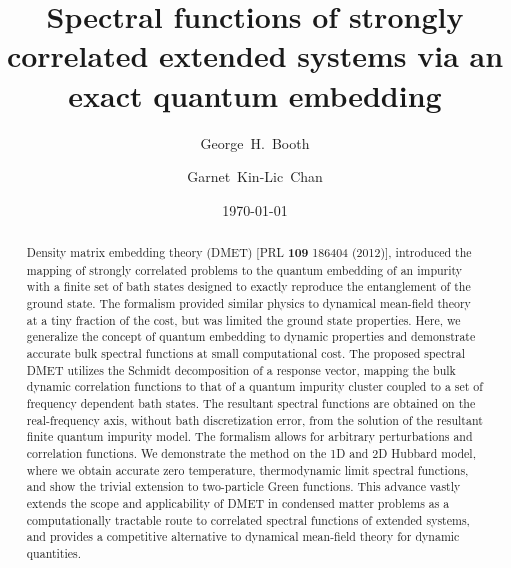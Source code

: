 \documentclass[aps,twocolumn,nobibnotes]{revtex4}
\begin{document}
\title{Spectral functions of strongly correlated extended systems via an exact quantum embedding}
\author{George~H.~Booth}
\author{Garnet~Kin-Lic~Chan}  

\begin{abstract}
Density matrix embedding theory (DMET) [PRL {\bf 109} 186404 (2012)], introduced the mapping of strongly correlated problems to the quantum embedding
of an impurity with a finite set of bath states designed to exactly reproduce the entanglement of the ground state. The formalism
provided similar physics to dynamical mean-field theory at a tiny fraction of the cost, but was limited the ground state properties.
Here, we generalize the concept of quantum embedding to dynamic properties and demonstrate accurate bulk spectral functions at small
computational cost. 
The proposed spectral DMET utilizes the Schmidt decomposition of a response vector, mapping the bulk dynamic correlation functions to that of
a quantum impurity cluster coupled to a set of frequency dependent bath states.
The resultant spectral functions are obtained on the real-frequency axis, without bath discretization error, from the solution of the resultant
finite quantum impurity model. The formalism allows for arbitrary perturbations and correlation functions.
We demonstrate the method on the 1D and 2D Hubbard model, where we obtain accurate 
zero temperature, thermodynamic limit spectral functions, and show the trivial extension to two-particle Green functions. 
This advance vastly extends the scope and applicability 
of DMET in condensed matter problems as a computationally tractable route to correlated spectral functions of extended systems, 
and provides a competitive alternative to dynamical mean-field theory for dynamic quantities.
\end{abstract}
\date{\today}
\maketitle
\end{document}
